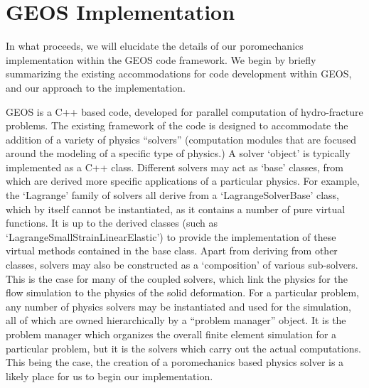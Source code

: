 \documentclass[11pt]{article} %
\begin{document}
\newpage
\section{GEOS Implementation}

In what proceeds, we will elucidate the details of our poromechanics implementation within the GEOS code framework. We begin by briefly summarizing the existing accommodations for code development within GEOS, and our approach to the implementation.

GEOS is a C++ based code, developed for parallel computation of hydro-fracture problems. The existing framework of the code is designed to accommodate the addition of a variety of physics ``solvers'' (computation modules that are focused around the modeling of a specific type of physics.) A solver `object' is typically implemented as a C++ class. Different solvers may act as `base' classes, from which are derived more specific applications of a particular physics. For example, the `Lagrange' family of solvers all derive from a `LagrangeSolverBase' class, which by itself cannot be instantiated, as it contains a number of pure virtual functions. It is up to the derived classes (such as `LagrangeSmallStrainLinearElastic') to provide the implementation of these virtual methods contained in the base class. Apart from deriving from other classes, solvers may also be constructed as a `composition' of various sub-solvers. This is the case for many of the coupled solvers, which link the physics for the flow simulation to the physics of the solid deformation. For a particular problem, any number of physics solvers may be instantiated and used for the simulation, all of which are owned hierarchically by a ``problem manager'' object. It is the problem manager which organizes the overall finite element simulation for a particular problem, but it is the solvers which carry out the actual computations. This being the case, the creation of a poromechanics based physics solver is a likely place for us to begin our implementation.
\end{document}

